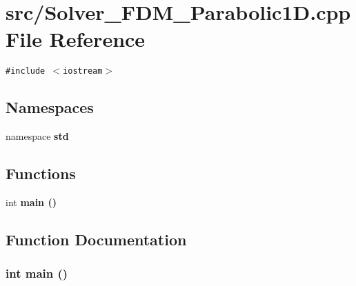 \section{src/Solver\_\-FDM\_\-Parabolic1D.cpp File Reference}
\label{Solver__FDM__Parabolic1D_8cpp}
{\tt \#include $<$iostream$>$}\par
\subsection*{Namespaces}
\begin{CompactItemize}
\item 
namespace \bf{std}
\end{CompactItemize}
\subsection*{Functions}
\begin{CompactItemize}
\item 
int \bf{main} ()
\end{CompactItemize}


\subsection{Function Documentation}
\subsubsection{\setlength{\rightskip}{0pt plus 5cm}int main ()}\label{Solver__FDM__Parabolic1D_8cpp_e66f6b31b5ad750f1fe042a706a4e3d4}


